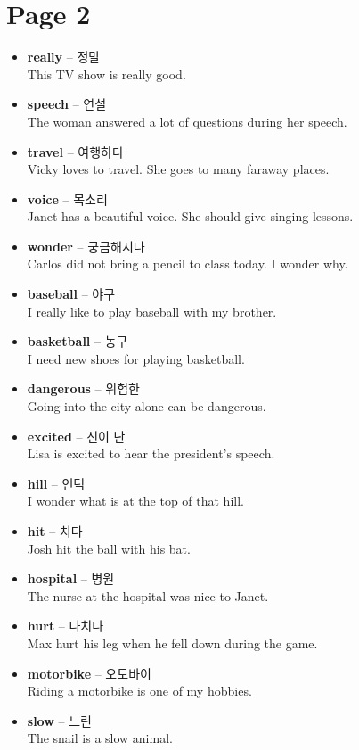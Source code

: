 \documentclass[12pt]{article}
\begin{document}
\newpage
\section*{Page 2}
\begin{itemize}
    \item \textbf{really} -- 정말 \\
    This TV show is really good.
    \item \textbf{speech} -- 연설 \\
    The woman answered a lot of questions during her speech.
    \item \textbf{travel} -- 여행하다 \\
    Vicky loves to travel. She goes to many faraway places.
    \item \textbf{voice} -- 목소리 \\
    Janet has a beautiful voice. She should give singing lessons.
    \item \textbf{wonder} -- 궁금해지다 \\
    Carlos did not bring a pencil to class today. I wonder why.
    \item \textbf{baseball} -- 야구 \\
    I really like to play baseball with my brother.
    \item \textbf{basketball} -- 농구 \\
    I need new shoes for playing basketball.
    \item \textbf{dangerous} -- 위험한 \\
    Going into the city alone can be dangerous.
    \item \textbf{excited} -- 신이 난 \\
    Lisa is excited to hear the president's speech.
    \item \textbf{hill} -- 언덕 \\
    I wonder what is at the top of that hill.
    \item \textbf{hit} -- 치다 \\
    Josh hit the ball with his bat.
    \item \textbf{hospital} -- 병원 \\
    The nurse at the hospital was nice to Janet.
    \item \textbf{hurt} -- 다치다 \\
    Max hurt his leg when he fell down during the game.
    \item \textbf{motorbike} -- 오토바이 \\
    Riding a motorbike is one of my hobbies.
    \item \textbf{slow} -- 느린 \\
    The snail is a slow animal.
\end{itemize}
\end{document}
